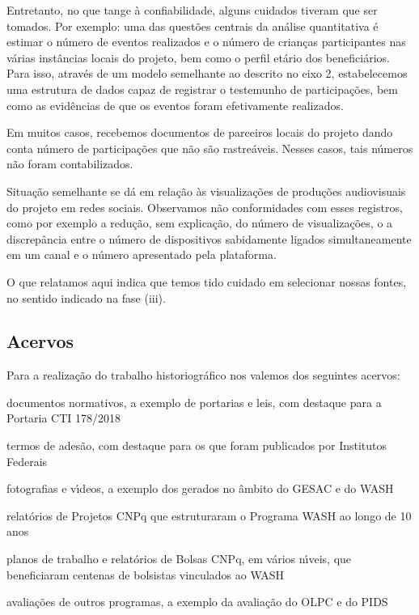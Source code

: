 \documentclass[
12pt,		%
openright,	%
twoside,  %
a4paper,			%
chapter=TITLE,		%
english,			%
french,				%
spanish,			%
brazil				%
]{USPSC-classe/USPSC}
\begin{document}
Entretanto, no que tange \`a confiabilidade, alguns cuidados tiveram que ser tomados. Por exemplo: uma das quest\~oes centrais da an\'alise quantitativa \'e estimar o n\'umero de eventos realizados e o n\'umero de crian\c{c}as participantes nas v\'arias inst\^ancias locais do projeto, bem como o perfil et\'ario dos benefici\'arios. Para isso, atrav\'es de um modelo semelhante ao descrito no eixo 2, estabelecemos uma estrutura de dados capaz de registrar o testemunho de participa\c{c}\~oes, bem como as evid\^encias de que os eventos foram efetivamente realizados.




Em muitos casos, recebemos documentos de parceiros locais do projeto dando conta n\'umero de participa\c{c}\~oes que n\~ao s\~ao rastre\'aveis. Nesses casos, tais n\'umeros n\~ao foram contabilizados.




Situa\c{c}\~ao semelhante se d\'a em rela\c{c}\~ao \`as visualiza\c{c}\~oes de produ\c{c}\~oes audiovisuais do projeto em redes sociais. Observamos n\~ao conformidades com esses registros, como por exemplo a redu\c{c}\~ao, sem explica\c{c}\~ao, do n\'umero de visualiza\c{c}\~oes, o a discrep\^ancia entre o n\'umero de dispositivos sabidamente ligados simultaneamente em um canal e o n\'umero apresentado pela plataforma.




O que relatamos aqui indica que temos tido cuidado em selecionar nossas fontes, no sentido indicado na fase (iii).




\subsection[Acervos]{Acervos}\label{Acervos}
Para a realiza\c{c}\~ao do trabalho historiogr\'afico nos valemos dos seguintes acervos:





\begin{alineas}
\item documentos normativos, a exemplo de portarias e leis, com destaque para a Portaria CTI 178/2018
\item termos de ades\~ao, com destaque para os que foram publicados por Institutos Federais
\item fotografias e v\'{\i}deos, a exemplo dos gerados no \^ambito do GESAC e do WASH
\item relat\'orios de Projetos CNPq que estruturaram o Programa WASH ao longo de 10 anos
\item planos de trabalho e relat\'orios de Bolsas CNPq, em v\'arios n\'{\i}veis, que beneficiaram centenas de bolsistas vinculados ao WASH
\item avalia\c{c}\~oes de outros programas, a exemplo da avalia\c{c}\~ao do OLPC e do PIDS
\end{alineas}
\end{document}
